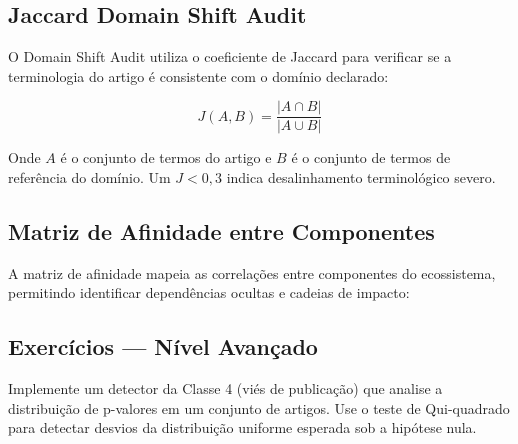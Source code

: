 \subsection{Jaccard Domain Shift Audit}

O Domain Shift Audit utiliza o coeficiente de Jaccard para verificar
se a terminologia do artigo é consistente com o domínio declarado:

\begin{equation}
J(A,B) = \frac{|A \cap B|}{|A \cup B|}
\label{eq:jaccard}
\end{equation}

Onde $A$ é o conjunto de termos do artigo e $B$ é o conjunto de
termos de referência do domínio. Um $J < 0,3$ indica desalinhamento
terminológico severo.

\subsection{Matriz de Afinidade entre Componentes}

A matriz de afinidade mapeia as correlações entre componentes do
ecossistema, permitindo identificar dependências ocultas e cadeias
de impacto:

\begin{table}[htb]
\centering
    \small
\caption{Matriz de Afinidade (Afinidades mais altas do ecossistema)}
\label{tab:matriz-afinidade}
\end{table}

\subsection{Exercícios — Nível Avançado}

\begin{exercicio}
Implemente um detector da Classe 4 (viés de publicação) que analise
a distribuição de p-valores em um conjunto de artigos. Use o teste
de Qui-quadrado para detectar desvios da distribuição uniforme
esperada sob a hipótese nula.
\end{exercicio}

